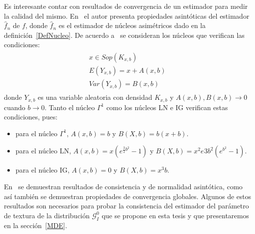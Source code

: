 Es interesante contar con resultados de convergencia de un estimador para medir la calidad del mismo. En~\cite{Libnegue2013} el autor presenta propiedades asintóticas del estimador $\widehat{f}_n$ de $f$, donde $\widehat{f}_n$ es el estimador de núcleos asimétricos dado en la definición~\ref{DefNucleo}. De acuerdo a~\cite{Libnegue2013,kokonendji2018} se consideran los núcleos que verifican las condiciones: 
\begin{align}
\label{CondNucleos}
\begin{split}
x \in Sop(K_{x,b})\\
E(Y_{x,b})=x+A(x,b)\\
Var(Y_{x,b})=B(x,b)
\end{split}
\end{align}
donde $Y_{x,b}$ es una variable aleatoria con densidad $K_{x,b}$ y $A(x,b),B(x,b) \to 0$ cuando $b \to 0$. Tanto el núcleo $\Gamma^1$ como los núcleos LN e IG verifican estas condiciones, pues:
\begin{itemize}
	\item para el núcleo $\Gamma^1$, $A(x,b)=b$ y $B(X,b)=b(x+b)$.
	\item para el núcleo LN, $A(x,b)=x(e^{\frac{3}{2} b^2}-1)$ y $B(X,b)=x^2 e^{}3b^2 (e^{b^2}-1)$.
	\item para el núcleo IG, $A(x,b)=0$ y $B(X,b)=x^3 b$.
\end{itemize}

En~\cite{Libnegue2013,kokonendji2018} se demuestran resultados de consistencia y de normalidad asintótica, como así también se demuestran propiedades de convergencia globales. Algunos de estos resultados son necesarios para probar la consistencia del estimador del parámetro de textura de la distribución $\mathcal{G}_I^0$ que se propone en esta tesis y que presentaremos en la sección~\ref{MDE}.

%
%


